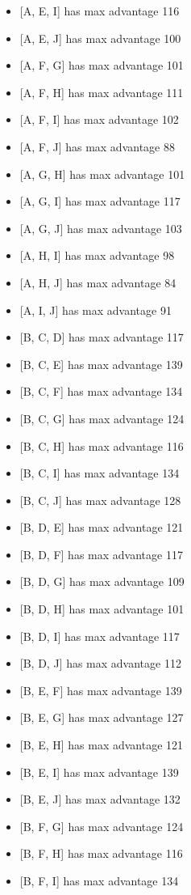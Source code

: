 \begin{puzzleSolutions}
\begin{multicols}{2}
\begin{itemize}
\item{} [A, E, I] has max advantage 116
\item{} [A, E, J] has max advantage 100
\item{} [A, F, G] has max advantage 101
\item{} [A, F, H] has max advantage 111
\item{} [A, F, I] has max advantage 102
\item{} [A, F, J] has max advantage 88
\item{} [A, G, H] has max advantage 101
\item{} [A, G, I] has max advantage 117
\item{} [A, G, J] has max advantage 103
\item{} [A, H, I] has max advantage 98
\item{} [A, H, J] has max advantage 84
\item{} [A, I, J] has max advantage 91
\item{} [B, C, D] has max advantage 117
\item{} [B, C, E] has max advantage 139
\item{} [B, C, F] has max advantage 134
\item{} [B, C, G] has max advantage 124
\item{} [B, C, H] has max advantage 116
\item{} [B, C, I] has max advantage 134
\item{} [B, C, J] has max advantage 128
\item{} [B, D, E] has max advantage 121
\item{} [B, D, F] has max advantage 117
\item{} [B, D, G] has max advantage 109
\item{} [B, D, H] has max advantage 101
\item{} [B, D, I] has max advantage 117
\item{} [B, D, J] has max advantage 112
\item{} [B, E, F] has max advantage 139
\item{} [B, E, G] has max advantage 127
\item{} [B, E, H] has max advantage 121
\item{} [B, E, I] has max advantage 139
\item{} [B, E, J] has max advantage 132
\item{} [B, F, G] has max advantage 124
\item{} [B, F, H] has max advantage 116
\item{} [B, F, I] has max advantage 134

\end{itemize}
\end{multicols}
\end{puzzleSolutions}

